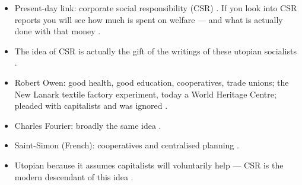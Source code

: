 \begin{CriticalPoint}
\begin{itemize}
    \item Present-day link: corporate social responsibility (CSR) . If you look into CSR reports you will see how much is spent on welfare --- and what is actually done with that money .
    \item The idea of CSR is actually the gift of the writings of these utopian socialists .
\end{itemize}
\end{CriticalPoint}

\begin{QuickRevision}
\begin{itemize}
    \item Robert Owen: good health, good education, cooperatives, trade unions; the New Lanark textile factory experiment, today a World Heritage Centre; pleaded with capitalists and was ignored .
    \item Charles Fourier: broadly the same idea .
    \item Saint-Simon (French): cooperatives and centralised planning .
    \item Utopian because it assumes capitalists will voluntarily help --- CSR is the modern descendant of this idea .
\end{itemize}
\end{QuickRevision}


